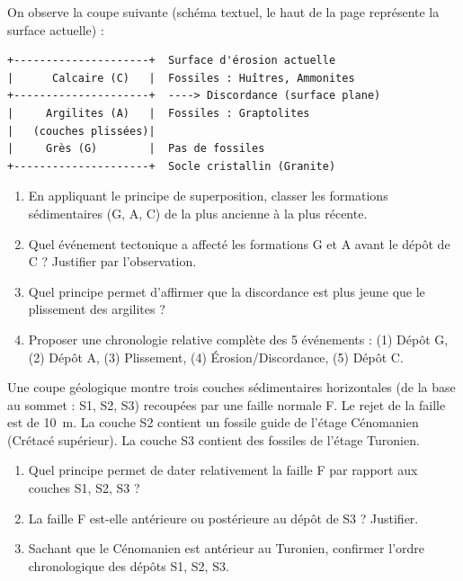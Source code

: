 \documentclass[11pt]{article}
\begin{document}
\begin{exercice}
On observe la coupe suivante (schéma textuel, le haut de la page représente la surface actuelle) :
\begin{verbatim}
+---------------------+  Surface d'érosion actuelle
|      Calcaire (C)   |  Fossiles : Huîtres, Ammonites
+---------------------+  ----> Discordance (surface plane)
|     Argilites (A)   |  Fossiles : Graptolites
|   (couches plissées)|  
|     Grès (G)        |  Pas de fossiles
+---------------------+  Socle cristallin (Granite)
\end{verbatim}
\begin{enumerate}
    \item En appliquant le principe de superposition, classer les formations sédimentaires (G, A, C) de la plus ancienne à la plus récente.
    \item Quel événement tectonique a affecté les formations G et A avant le dépôt de C ? Justifier par l'observation.
    \item Quel principe permet d'affirmer que la discordance est plus jeune que le plissement des argilites ?
    \item Proposer une chronologie relative complète des 5 événements : (1) Dépôt G, (2) Dépôt A, (3) Plissement, (4) Érosion/Discordance, (5) Dépôt C.
\end{enumerate}
\end{exercice}

\begin{exercice}
Une coupe géologique montre trois couches sédimentaires horizontales (de la base au sommet : S1, S2, S3) recoupées par une faille normale F. Le rejet de la faille est de \SI{10}{\meter}. La couche S2 contient un fossile guide de l'étage Cénomanien (Crétacé supérieur). La couche S3 contient des fossiles de l'étage Turonien.
\begin{enumerate}
    \item Quel principe permet de dater relativement la faille F par rapport aux couches S1, S2, S3 ?
    \item La faille F est-elle antérieure ou postérieure au dépôt de S3 ? Justifier.
    \item Sachant que le Cénomanien est antérieur au Turonien, confirmer l'ordre chronologique des dépôts S1, S2, S3.
\end{enumerate}
\end{exercice}
\end{document}
